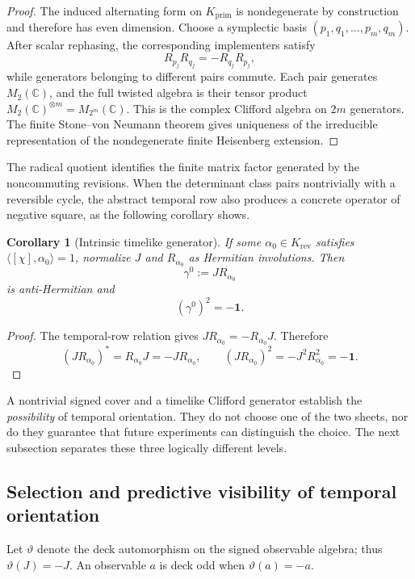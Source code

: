 \documentclass[11pt]{article}
\newtheorem{corollary}[theorem]{Corollary}
\theoremstyle{definition}
\theoremstyle{remark}
\newcommand{\C}{\mathbb C}
\newcommand{\one}{\mathbf 1}
\newcommand{\rev}{\mathrm{rev}}
\begin{document}
\begin{proof}
The induced alternating form on $K_{\mathrm{prim}}$ is nondegenerate by
construction and therefore has even dimension.  Choose a symplectic basis
$(p_1,q_1,\ldots,p_m,q_m)$.  After scalar rephasing, the corresponding
implementers satisfy
\[
 R_{p_j}R_{q_j}=-R_{q_j}R_{p_j},
\]
while generators belonging to different pairs commute.  Each pair generates
$M_2(\C)$, and the full twisted algebra is their tensor product
$M_2(\C)^{\otimes m}=M_{2^m}(\C)$.  This is the complex Clifford algebra on
$2m$ generators.  The finite Stone--von Neumann theorem gives uniqueness of
the irreducible representation of the nondegenerate finite Heisenberg
extension.
\end{proof}

The radical quotient identifies the finite matrix factor generated by the
noncommuting revisions.  When the determinant class pairs nontrivially with a
reversible cycle, the abstract temporal row also produces a concrete operator of
negative square, as the following corollary shows.

\begin{corollary}[Intrinsic timelike generator]
\label{cor:timelike-generator}
If some $\alpha_0\in K_{\rev}$ satisfies
$\langle[\chi],\alpha_0\rangle=1$, normalize $J$ and $R_{\alpha_0}$ as
Hermitian involutions.  Then
\[
 \gamma^0:=JR_{\alpha_0}
\]
is anti-Hermitian and
\[
 (\gamma^0)^2=-\one.
\]
\end{corollary}

\begin{proof}
The temporal-row relation gives
$JR_{\alpha_0}=-R_{\alpha_0}J$.  Therefore
\[
 (JR_{\alpha_0})^*=R_{\alpha_0}J=-JR_{\alpha_0},
 \qquad
 (JR_{\alpha_0})^2=-J^2R_{\alpha_0}^2=-\one.
\]
\end{proof}

A nontrivial signed cover and a timelike Clifford generator establish the
\emph{possibility} of temporal orientation.  They do not choose one of the two
sheets, nor do they guarantee that future experiments can distinguish the choice.
The next subsection separates these three logically different levels.

\subsection{Selection and predictive visibility of temporal orientation}

Let $\vartheta$ denote the deck automorphism on the signed observable algebra;
thus $\vartheta(J)=-J$.  An observable $a$ is deck odd when
$\vartheta(a)=-a$.
\end{document}

